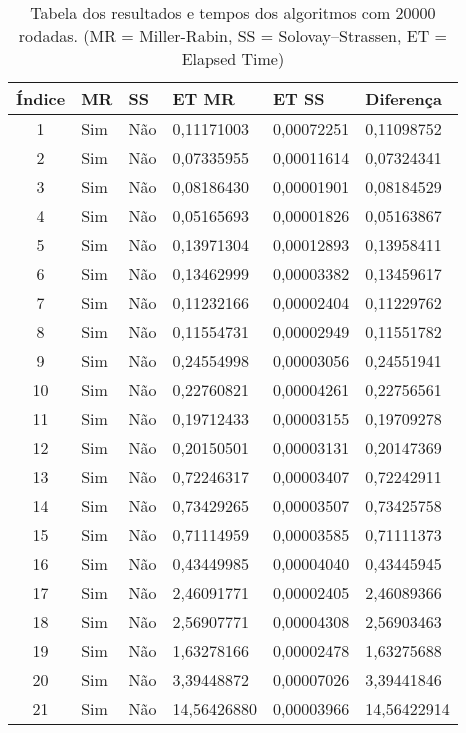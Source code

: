 \documentclass[openany]{ufsctex/ufsctex}
\begin{document}
 	
\begin{longtable}{|c|p{1cm}|p{1cm}|p{2cm}|p{2cm}|p{2cm}|}
 \caption{Tabela dos resultados e tempos dos algoritmos com 20000 rodadas. (MR = Miller-Rabin, SS = Solovay–Strassen, ET = Elapsed Time) }\label{tab:comparacao}\\
 \hline
 Índice & MR & SS & ET MR & ET SS & Diferença \\ \hline
 
1 & Sim & Não & 0,11171003 & 0,00072251 & 0,11098752\\ \hline 
2 & Sim & Não & 0,07335955 & 0,00011614 & 0,07324341\\ \hline 
3 & Sim & Não & 0,08186430 & 0,00001901 & 0,08184529\\ \hline 
4 & Sim & Não & 0,05165693 & 0,00001826 & 0,05163867\\ \hline 
5 & Sim & Não & 0,13971304 & 0,00012893 & 0,13958411\\ \hline 
6 & Sim & Não & 0,13462999 & 0,00003382 & 0,13459617\\ \hline 
7 & Sim & Não & 0,11232166 & 0,00002404 & 0,11229762\\ \hline 
8 & Sim & Não & 0,11554731 & 0,00002949 & 0,11551782\\ \hline 
9 & Sim & Não & 0,24554998 & 0,00003056 & 0,24551941\\ \hline 
10 & Sim & Não & 0,22760821 & 0,00004261 & 0,22756561\\ \hline 
11 & Sim & Não & 0,19712433 & 0,00003155 & 0,19709278\\ \hline 
12 & Sim & Não & 0,20150501 & 0,00003131 & 0,20147369\\ \hline 
13 & Sim & Não & 0,72246317 & 0,00003407 & 0,72242911\\ \hline 
14 & Sim & Não & 0,73429265 & 0,00003507 & 0,73425758\\ \hline 
15 & Sim & Não & 0,71114959 & 0,00003585 & 0,71111373\\ \hline 
16 & Sim & Não & 0,43449985 & 0,00004040 & 0,43445945\\ \hline 
17 & Sim & Não & 2,46091771 & 0,00002405 & 2,46089366\\ \hline 
18 & Sim & Não & 2,56907771 & 0,00004308 & 2,56903463\\ \hline 
19 & Sim & Não & 1,63278166 & 0,00002478 & 1,63275688\\ \hline 
20 & Sim & Não & 3,39448872 & 0,00007026 & 3,39441846\\ \hline 
21 & Sim & Não & 14,56426880 & 0,00003966 & 14,56422914\\ \hline 

\end{longtable}
\end{document}
